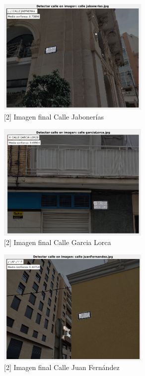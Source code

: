 \documentclass[12pt]{article}
\begin{document}
	\pagebreak
	
	\begin{figure}[h!]
		\begin{center}
			\includegraphics[width=0.65\textwidth]{img/2_5.png}
			\caption{[2] Imagen final Calle Jabonerías}
		\end{center}
	\end{figure}
	
	\begin{figure}[h!]
		\begin{center}
			\includegraphics[width=0.65\textwidth]{img/2_6.png}
			\caption{[2] Imagen final Calle Garcia Lorca}
		\end{center}
	\end{figure}
	
	\pagebreak
	
	\begin{figure}[h!]
		\begin{center}
			\includegraphics[width=0.65\textwidth]{img/2_7.png}
			\caption{[2] Imagen final Calle Juan Fernández}
		\end{center}
	\end{figure}
	
\end{document}
